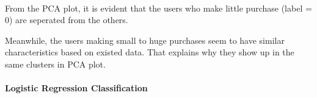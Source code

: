 \documentclass[11pt]{article}
\begin{document}
    \begin{center}
    \end{center}
    { \hspace*{\fill} \\}
    
    From the PCA plot, it is evident that the users who make little purchase
(label = 0) are seperated from the others.

Meanwhile, the users making small to huge purchases seem to have similar
characteristics based on existed data. That explains why they show up in
the same clusters in PCA plot.

    \paragraph{Logistic Regression
Classification}\label{logistic-regression-classification}
\end{document}
